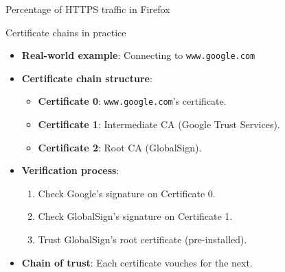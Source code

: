 \documentclass[aspectratio=169, lualatex, handout]{beamer}
\begin{document}
\begin{frame}{Percentage of HTTPS traffic in Firefox}
\end{frame}

\begin{frame}{Certificate chains in practice}
	\begin{itemize}
		\item \textbf{Real-world example}: Connecting to \texttt{www.google.com}
		\item \textbf{Certificate chain structure}:
		      \begin{itemize}
			      \item \textbf{Certificate 0}: \texttt{www.google.com}'s certificate.
			      \item \textbf{Certificate 1}: Intermediate CA (Google Trust Services).
			      \item \textbf{Certificate 2}: Root CA (GlobalSign).
		      \end{itemize}
		\item \textbf{Verification process}:
		      \begin{enumerate}
			      \item Check Google's signature on Certificate 0.
			      \item Check GlobalSign's signature on Certificate 1.
			      \item Trust GlobalSign's root certificate (pre-installed).
		      \end{enumerate}
		\item \textbf{Chain of trust}: Each certificate vouches for the next.
	\end{itemize}
\end{frame}
\end{document}
